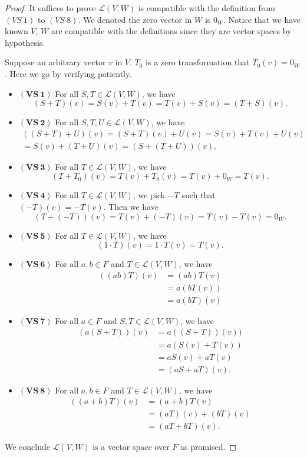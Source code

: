 \begin{Exercise}
\begin{proof}
It suffices to prove $\mathcal{L}(V,W)$ is compatible with the definition from $(VS\ 1)$ to $(VS\ 8)$. We denoted the zero vector in $W$ is $0_W$. Notice that we have known $V$, $W$ are compatible with the definitions since they are vector spaces by hypothesis.

Suppose an arbitrary vector $v$ in $V$. $T_0$ is a zero transformation that $T_0(v) = 0_W$. Here we go by verifying patiently.

\begin{itemize}
\item $\mathbf{(VS\ 1)}$
For all $S,T \in \mathcal{L}(V,W)$, we have
$$
(S+T)(v)
= S(v) + T(v)
= T(v) + S(v)
= (T+S)(v).
$$

\item $\mathbf{(VS\ 2)}$
For all $S,T,U\in \mathcal{L}(V,W)$, we have
\begin{gather*}
((S+T)+U)(v)
= (S+T)(v) + U(v)
= S(v) + T(v) + U(v) \\
= S(v) + (T+U)(v) 
= (S+(T+U))(v).
\end{gather*}

\item $\mathbf{(VS\ 3)}$
For all $T\in \mathcal{L}(V,W)$, we have
$$
(T+T_0)(v)
= T(v) + T_0(v)
= T(v) + 0_W
= T(v).
$$

\item $\mathbf{(VS\ 4)}$
For all $T\in \mathcal{L}(V,W)$, we pick $-T$ such that $(-T)(v) = -T(v)$. Then we have
$$
(T+(-T))(v)
= T(v) + (-T)(v)
= T(v) - T(v)
= 0_W.
$$

\item $\mathbf{(VS\ 5)}$
For all $T\in \mathcal{L}(V,W)$, we have
$$
(1\cdot T)(v)
= 1\cdot T(v)
= T(v).
$$

\item $\mathbf{(VS\ 6)}$
For all $a,b\in F$ and $T\in \mathcal{L}(V,W)$, we have
\begin{align*}
((ab)T)(v)
&= (ab)T(v) \\
&= a(b T(v)) \\
&= a(b T)(v)
\end{align*}

\item $\mathbf{(VS\ 7)}$
For all $a\in F$ and $S,T\in \mathcal{L}(V,W)$, we have
\begin{align*}
(a(S+T))(v)
&= a((S+T))(v)) \\
&= a(S(v) + T(v)) \\
&= a S(v) + a T(v) \\
&= (a S+a T)(v).
\end{align*}

\item $\mathbf{(VS\ 8)}$
For all $a,b\in F$ and $T\in \mathcal{L}(V,W)$, we have
\begin{align*}
((a+b)T)(v)
&= (a+b)T(v) \\
&= (a T)(v) + (b T)(v) \\
&= (a T + b T)(v).
\end{align*}
\end{itemize}
We conclude $\mathcal{L}(V,W)$ is a vector space over $F$ as promised.
\end{proof}
\end{Exercise}